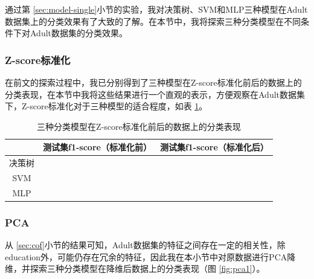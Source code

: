 \documentclass[12pt,a4paper]{article}
\theoremstyle{definition}
\begin{document}
通过第 \ref{sec:model-single}小节的实验，我对决策树、SVM和MLP三种模型在Adult数据集上的分类效果有了大致的了解。在本节中，我将探索三种分类模型在不同条件下对Adult数据集的分类效果。

\subsubsection{Z-score标准化}

在前文的探索过程中，我已分别得到了三种模型在Z-score标准化前后的数据上的分类表现，在本节中我将这些结果进行一个直观的表示，方便观察在Adult数据集下，Z-score标准化对于三种模型的适合程度，如表 \ref{tab:norm}。

\begin{table}[H]
	\renewcommand\arraystretch{1.35}
	\caption{三种分类模型在Z-score标准化前后的数据上的分类表现}
	\label{tab:norm}
	\centering
	
	\begin{tabular}{c|c|c}
		\centering
		 & 测试集f1-score（标准化前） & 测试集f1-score（标准化后） \\
		\hline
		\hline
		
		决策树 & & \\
		SVM & & \\
		MLP & & \\	

	\end{tabular}
\end{table}

\subsubsection{PCA}

从 \ref{sec:cof}小节的结果可知，Adult数据集的特征之间存在一定的相关性，除education外，可能仍存在冗余的特征，因此我在本小节中对原数据进行PCA降维，并探索三种分类模型在降维后数据上的分类表现（图 \ref{fig:pca1}）。
\end{document}
